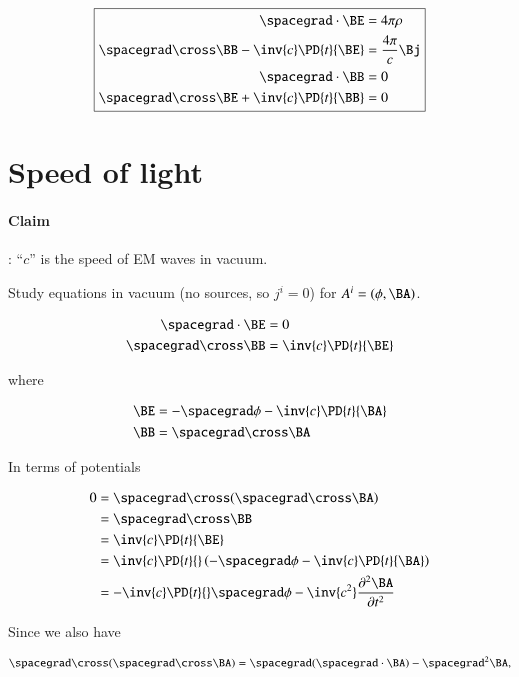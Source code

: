 \begin{equation}\label{eqn:relativisticElectrodynamicsL13:410}
\boxed{
\begin{aligned}
\spacegrad \cdot \BE &= 4 \pi \rho \\
\spacegrad \cross \BB -\inv{c} \PD{t}{\BE} &= \frac{4 \pi}{c} \Bj \\
\spacegrad \cdot \BB &= 0 \\
\spacegrad \cross \BE +\inv{c} \PD{t}{\BB} &= 0
\end{aligned}
}
\end{equation}

\section{Speed of light}

\paragraph{Claim}: ``$c$'' is the speed of EM waves in vacuum.

Study equations in vacuum (no sources, so $j^i = 0$) for $A^i = (\phi, \BA)$.

\begin{align}\label{eqn:relativisticElectrodynamicsL13:430}
\spacegrad \cdot \BE &= 0 \\
\spacegrad \cross \BB &= \inv{c} \PD{t}{\BE}
\end{align}

where

\begin{align}\label{eqn:relativisticElectrodynamicsL13:450}
\BE &= - \spacegrad \phi - \inv{c} \PD{t}{\BA} \\
\BB &= \spacegrad \cross \BA
\end{align}

In terms of potentials

\begin{align*}
0 &= \spacegrad \cross (\spacegrad \cross \BA) \\
&= \spacegrad \cross \BB \\
&= \inv{c} \PD{t}{\BE} \\
&= \inv{c} \PD{t}{} \left( - \spacegrad \phi - \inv{c} \PD{t}{\BA} \right) \\
&= -\inv{c} \PD{t}{} \spacegrad \phi - \inv{c^2} \frac{\partial^2 \BA}{\partial t^2} 
\end{align*}

Since we also have

\begin{equation}\label{eqn:relativisticElectrodynamicsL13:600}
\spacegrad \cross (\spacegrad \cross \BA) = \spacegrad (\spacegrad \cdot \BA) - \spacegrad^2 \BA,
\end{equation}

